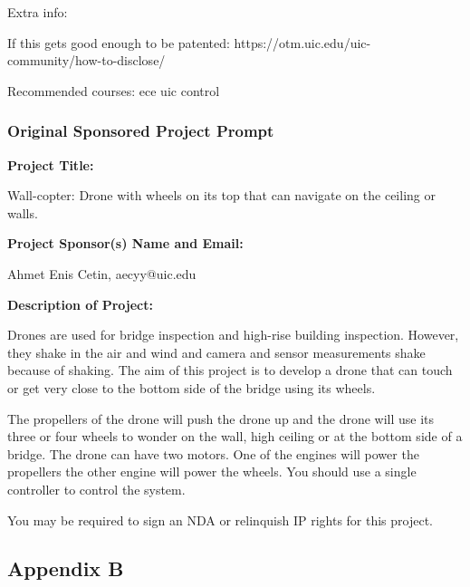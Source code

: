 \documentclass[12pt]{article}
\begin{document}
                \noindent Extra info:

                If this gets good enough to be patented: https://otm.uic.edu/uic-community/how-to-disclose/

                Recommended courses: ece uic control
            
            \subsubsection{Original Sponsored Project Prompt}

                \noindent\textbf{\large Project Title:}

                Wall-copter: Drone with wheels on its top that can navigate on the ceiling or walls.

                \noindent\textbf{\large Project Sponsor(s) Name and Email:}

                Ahmet Enis Cetin, aecyy@uic.edu

                \noindent\textbf{\large Description of Project:}

                Drones are used for bridge inspection and high-rise building inspection.
                However, they shake in the air and wind and camera and sensor measurements shake because of shaking.
                The aim of this project is to develop a drone that can touch or get very close to the bottom side of the bridge using its wheels.

                The propellers of the drone will push the drone up and the drone will use its three or four wheels to wonder on the wall, high ceiling or at the bottom side of a bridge.
                The drone can have two motors.
                One of the engines will power the propellers the other engine will power the wheels.
                You should use a single controller to control the system.

                You may be required to sign an NDA or relinquish IP rights for this project.
        
        \newpage
        \subsection{Appendix B}
            \newcommand{\ieeestd}[3]{
                \noindent\textbf{#1} \\
                \noindent\url{#2} \\
                \noindent#3 \\
                \vspace{0.5cm}

            }
\end{document}

